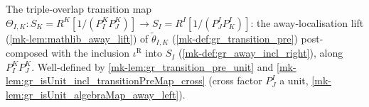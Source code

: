 \begin{definition}\label{mk-def:gr_cocycle_theta_ik}
  \leanok

  The triple-overlap transition map
  \(\Theta_{I,K} : S_K = R^K[1/(P^K_I P^K_J)] \to S_I = R^I[1/(P^I_J P^I_K)]\):
  the away-localisation lift (\ref{mk-lem:mathlib_away_lift}) of
  \(\tilde\theta_{I,K}\) (\ref{mk-def:gr_transition_pre}) post-composed with the
  inclusion \(\iota^{\mathrm{R}}\) into \(S_I\) (\ref{mk-def:gr_away_incl_right}),
  along \(P^K_I P^K_J\). Well-defined by \ref{mk-lem:gr_transition_pre_unit} and
  \ref{mk-lem:gr_isUnit_incl_transitionPreMap_cross} (cross factor \(P^I_J\) a
  unit, \ref{mk-lem:gr_isUnit_algebraMap_away_left}).
\end{definition}

